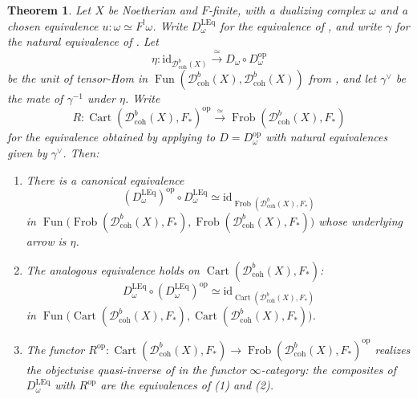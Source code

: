 \documentclass[11pt]{amsart}
\newcommand{\Cart}{\operatorname{Cart}}
\newcommand{\op}{{\operatorname{op}}}
\DeclareMathOperator{\Fun}{\mathrm{Fun}}
\newcommand{\Frob}{\operatorname{Frob}}
\newcommand{\Dbc}{\mathcal D^b_{\mathrm{coh}}}
\theoremstyle{plain}
\newtheorem{theorem}[theorem]{Theorem}
\theoremstyle{definition}
\numberwithin{equation}{section}
\begin{document}
\begin{theorem}\label{thm:bidual-leq}
Let $X$ be Noetherian and $F$-finite, with a dualizing complex $\omega$ and a chosen equivalence $u:\omega\simeq F^!\omega$.
Write $D_\omega^{\mathrm{LEq}}$ for the equivalence of , and write $\gamma$ for the natural equivalence of .
Let
\begin{equation}\label{eq:bidual-eta}
 \eta:\mathrm{id}_{\Dbc(X)}\xrightarrow{\ \simeq\ }D_\omega\circ D_\omega^{\op}
\end{equation}
be the unit of tensor-Hom in $\Fun(\Dbc(X),\Dbc(X))$ from , and let $\gamma^\vee$ be the mate of $\gamma^{-1}$ under $\eta$.
Write
\[
 R:\Cart(\Dbc(X),F_*)^{\op}\xrightarrow{\ \simeq\ }\Frob(\Dbc(X),F_*)
\]
for the equivalence obtained by applying  to $D=D_\omega^{\op}$ with natural equivalences given by $\gamma^\vee$.
Then:
\begin{enumerate}
\item
There is a canonical equivalence
\[
 (D_\omega^{\mathrm{LEq}})^{\op}\circ D_\omega^{\mathrm{LEq}}
 \simeq
 \mathrm{id}_{\Frob(\Dbc(X),F_*)}
\]
in $\Fun\bigl(\Frob(\Dbc(X),F_*),\Frob(\Dbc(X),F_*)\bigr)$ whose underlying arrow is $\eta$.
\item
The analogous equivalence holds on $\Cart(\Dbc(X),F_*)$:
\[
 D_\omega^{\mathrm{LEq}}\circ (D_\omega^{\mathrm{LEq}})^{\op}
 \simeq
 \mathrm{id}_{\Cart(\Dbc(X),F_*)}
\]
in $\Fun\bigl(\Cart(\Dbc(X),F_*),\Cart(\Dbc(X),F_*)\bigr)$.
\item
The functor $R^{\op}:\Cart(\Dbc(X),F_*)\to\Frob(\Dbc(X),F_*)^{\op}$ realizes the objectwise quasi-inverse of  in the functor $\infty$-category: the composites of $D_\omega^{\mathrm{LEq}}$ with $R^{\op}$ are the equivalences of \textup{(1)} and \textup{(2)}.
\end{enumerate}
\end{theorem}
\end{document}
